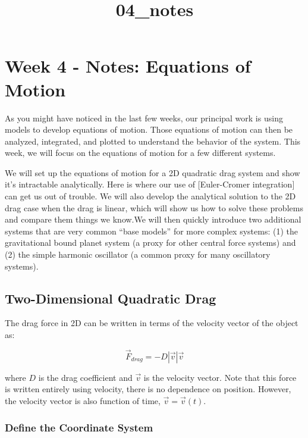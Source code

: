 \documentclass[11pt]{article}
\title{04\_notes}
\begin{document}
    
    \maketitle
    
    

    
    \section{Week 4 - Notes: Equations of
Motion}\label{week-4---notes-equations-of-motion}

As you might have noticed in the last few weeks, our principal work is
using models to develop equations of motion. Those equations of motion
can then be analyzed, integrated, and plotted to understand the behavior
of the system. This week, we will focus on the equations of motion for a
few different systems.

We will set up the equations of motion for a 2D quadratic drag system
and show it's intractable analytically. Here is where our use of
{[}Euler-Cromer integration{]} can get us out of trouble. We will also
develop the analytical solution to the 2D drag case when the drag is
linear, which will show us how to solve these problems and compare them
things we know.We will then quickly introduce two additional systems
that are very common ``base models'' for more complex systems: (1) the
gravitational bound planet system (a proxy for other central force
systems) and (2) the simple harmonic oscillator (a common proxy for many
oscillatory systems).

    \subsection{Two-Dimensional Quadratic
Drag}\label{two-dimensional-quadratic-drag}

The drag force in 2D can be written in terms of the velocity vector of
the object as:

\[\vec{F}_{drag} = -D |\vec{v}| \vec{v}\]

where \(D\) is the drag coefficient and \(\vec{v}\) is the velocity
vector. Note that this force is written entirely using velocity, there
is no dependence on position. However, the velocity vector is also
function of time, \(\vec{v} = \vec{v}(t)\).

\subsubsection{Define the Coordinate
System}\label{define-the-coordinate-system}
\end{document}
